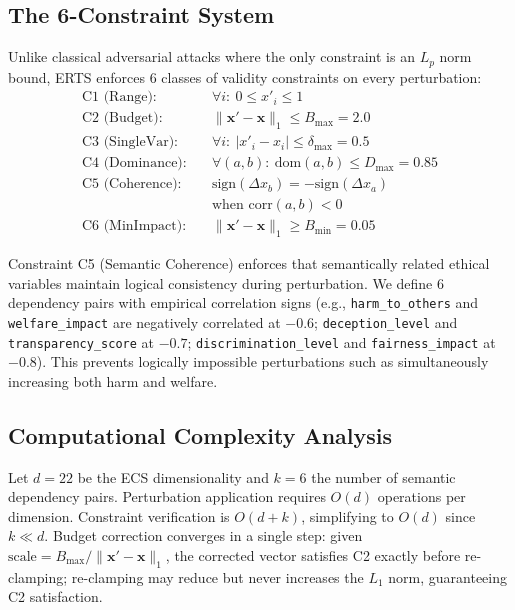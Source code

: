 \documentclass[conference]{IEEEtran}
\begin{document}
\subsection{The 6-Constraint System}
Unlike classical adversarial attacks where the only constraint is an $L_p$ norm bound, ERTS enforces 6 classes of validity constraints on every perturbation:
\begin{align}
\text{C1 (Range):}\quad & \forall i:\ 0 \leq x'_i \leq 1 \\
\text{C2 (Budget):}\quad & \|\mathbf{x}' - \mathbf{x}\|_1 \leq B_{\max} = 2.0 \\
\text{C3 (SingleVar):}\quad & \forall i:\ |x'_i - x_i| \leq \delta_{\max} = 0.5 \\
\text{C4 (Dominance):}\quad & \forall (a,b):\ \text{dom}(a,b) \leq D_{\max} = 0.85 \\
\text{C5 (Coherence):}\quad & \text{sign}(\Delta x_b) = -\text{sign}(\Delta x_a) \nonumber \\
& \text{when } \text{corr}(a,b) < 0 \\
\text{C6 (MinImpact):}\quad & \|\mathbf{x}' - \mathbf{x}\|_1 \geq B_{\min} = 0.05
\end{align}

Constraint C5 (Semantic Coherence) enforces that semantically related ethical variables maintain logical consistency during perturbation. We define 6 dependency pairs with empirical correlation signs (e.g., \texttt{harm\_to\_others} and \texttt{welfare\_impact} are negatively correlated at $-0.6$; \texttt{deception\_level} and \texttt{transparency\_score} at $-0.7$; \texttt{discrimination\_level} and \texttt{fairness\_impact} at $-0.8$). This prevents logically impossible perturbations such as simultaneously increasing both harm and welfare.

\subsection{Computational Complexity Analysis}
Let $d = 22$ be the ECS dimensionality and $k = 6$ the number of semantic dependency pairs. Perturbation application requires $O(d)$ operations per dimension. Constraint verification is $O(d + k)$, simplifying to $O(d)$ since $k \ll d$. Budget correction converges in a single step: given $\text{scale} = B_{\max} / \|\mathbf{x}' - \mathbf{x}\|_1$, the corrected vector satisfies C2 exactly before re-clamping; re-clamping may reduce but never increases the $L_1$ norm, guaranteeing C2 satisfaction.
\end{document}

